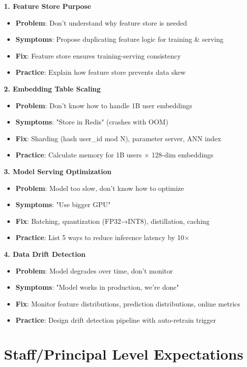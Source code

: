 \documentclass[10pt]{article}
\begin{document}
\textbf{1. Feature Store Purpose}
\begin{itemize}
\item \textbf{Problem}: Don't understand why feature store is needed
\item \textbf{Symptoms}: Propose duplicating feature logic for training \& serving
\item \textbf{Fix}: Feature store ensures training-serving consistency
\item \textbf{Practice}: Explain how feature store prevents data skew
\end{itemize}

\textbf{2. Embedding Table Scaling}
\begin{itemize}
\item \textbf{Problem}: Don't know how to handle 1B user embeddings
\item \textbf{Symptoms}: "Store in Redis" (crashes with OOM)
\item \textbf{Fix}: Sharding (hash user\_id mod N), parameter server, ANN index
\item \textbf{Practice}: Calculate memory for 1B users × 128-dim embeddings
\end{itemize}

\textbf{3. Model Serving Optimization}
\begin{itemize}
\item \textbf{Problem}: Model too slow, don't know how to optimize
\item \textbf{Symptoms}: "Use bigger GPU"
\item \textbf{Fix}: Batching, quantization (FP32→INT8), distillation, caching
\item \textbf{Practice}: List 5 ways to reduce inference latency by 10×
\end{itemize}

\textbf{4. Data Drift Detection}
\begin{itemize}
\item \textbf{Problem}: Model degrades over time, don't monitor
\item \textbf{Symptoms}: "Model works in production, we're done"
\item \textbf{Fix}: Monitor feature distributions, prediction distributions, online metrics
\item \textbf{Practice}: Design drift detection pipeline with auto-retrain trigger
\end{itemize}

\section{Staff/Principal Level Expectations}
\end{document}
